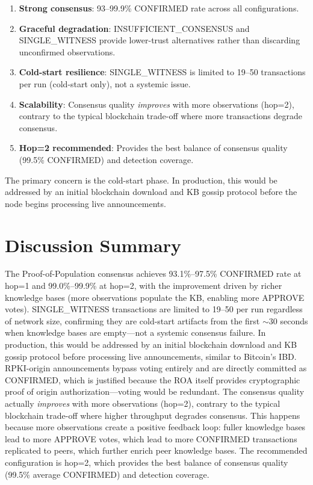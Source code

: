 \documentclass[11pt,a4paper]{article}
\begin{document}
\begin{enumerate}
    \item \textbf{Strong consensus}: 93--99.9\% CONFIRMED rate across all configurations.
    \item \textbf{Graceful degradation}: INSUFFICIENT\_CONSENSUS and SINGLE\_WITNESS
          provide lower-trust alternatives rather than discarding unconfirmed observations.
    \item \textbf{Cold-start resilience}: SINGLE\_WITNESS is limited to 19--50 transactions
          per run (cold-start only), not a systemic issue.
    \item \textbf{Scalability}: Consensus quality \emph{improves} with more observations
          (hop=2), contrary to the typical blockchain trade-off where more transactions
          degrade consensus.
    \item \textbf{Hop=2 recommended}: Provides the best balance of consensus quality
          (99.5\% CONFIRMED) and detection coverage.
\end{enumerate}

The primary concern is the cold-start phase. In production, this would be addressed
by an initial blockchain download and KB gossip protocol before the node begins
processing live announcements.

\section{Discussion Summary}

The Proof-of-Population consensus achieves 93.1\%--97.5\% CONFIRMED rate at hop=1 and 99.0\%--99.9\% at hop=2, with the improvement driven by richer knowledge bases (more observations populate the KB, enabling more APPROVE votes). SINGLE\_WITNESS transactions are limited to 19--50 per run regardless of network size, confirming they are cold-start artifacts from the first $\sim$30 seconds when knowledge bases are empty---not a systemic consensus failure. In production, this would be addressed by an initial blockchain download and KB gossip protocol before processing live announcements, similar to Bitcoin's IBD. RPKI-origin announcements bypass voting entirely and are directly committed as CONFIRMED, which is justified because the ROA itself provides cryptographic proof of origin authorization---voting would be redundant. The consensus quality actually \emph{improves} with more observations (hop=2), contrary to the typical blockchain trade-off where higher throughput degrades consensus. This happens because more observations create a positive feedback loop: fuller knowledge bases lead to more APPROVE votes, which lead to more CONFIRMED transactions replicated to peers, which further enrich peer knowledge bases. The recommended configuration is hop=2, which provides the best balance of consensus quality (99.5\% average CONFIRMED) and detection coverage.
\end{document}
